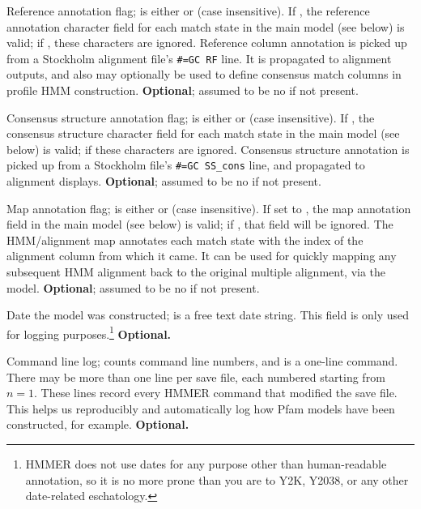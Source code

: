 \begin{wideitem}
\item [\emprog{RF <s>}] Reference annotation flag;  is
either  or  (case insensitive). If , the
reference annotation character field for each match state in the main
model (see below) is valid; if , these characters are
ignored.  Reference column annotation is picked up from a Stockholm
alignment file's \verb+#=GC RF+ line. It is propagated to alignment
outputs, and also may optionally be used to define consensus match
columns in profile HMM construction. \textbf{Optional}; assumed to be
no if not present.

\item [\emprog{CS <s>}] Consensus structure annotation flag;
 is either  or  (case insensitive). If
, the consensus structure character field for each match
state in the main model (see below) is valid; if  these
characters are ignored. Consensus structure annotation is picked up
from a Stockholm file's \verb+#=GC SS_cons+ line, and propagated to
alignment displays.  \textbf{Optional}; assumed to be no if not
present.

\item [\emprog{MAP <s>}] Map annotation flag;  is either
 or  (case insensitive).  If set to , the
map annotation field in the main model (see below) is valid; if
, that field will be ignored.  The HMM/alignment map
annotates each match state with the index of the alignment column from
which it came. It can be used for quickly mapping any subsequent
HMM alignment back to the original multiple alignment, via the model.
\textbf{Optional}; assumed to be no if not present.

\item [\emprog{DATE <s>}] Date the model was constructed; 
is a free text date string.  This field is only used for logging
purposes.\footnote{HMMER does not use dates for any purpose other than
human-readable annotation, so it is no more prone than you are to Y2K,
Y2038, or any other date-related eschatology.} \textbf{Optional.}

\item [\emprog{COM [<n>] <s>}] Command line log;  counts
command line numbers, and  is a one-line command. There may
be more than one  line per save file, each numbered starting
from $n=1$. These lines record every HMMER command that modified the
save file. This helps us reproducibly and automatically log how Pfam
models have been constructed, for example. \textbf{Optional.}


\end{wideitem}
